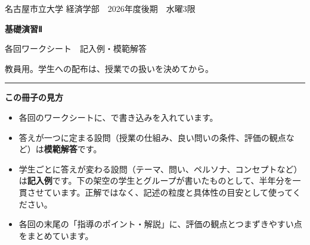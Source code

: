 \thispagestyle{cover}
\vspace*{12mm}
{\sffamily\color{pone}\large 名古屋市立大学 経済学部　2026年度後期　水曜3限}\par
\vspace{3mm}
{\sffamily\bfseries\fontsize{30pt}{38pt}\selectfont 基礎演習Ⅱ}\par
\vspace{2mm}
{\sffamily\fontsize{20pt}{26pt}\selectfont 各回ワークシート　\textcolor{ans}{記入例・模範解答}}\par
\vspace{2mm}
{\sffamily\small\color{inktwo}教員用。学生への配布は、授業での扱いを決めてから。}\par
\vspace{3mm}
{\color{inktwo}\rule{\linewidth}{0.6pt}}\par
\vspace{6mm}

\begin{tcolorbox}[enhanced,colback=papertwo,colframe=papertwo,boxrule=0pt,arc=1.5mm,
    left=4mm,right=4mm,top=3mm,bottom=3mm,fontupper=\small]
{\sffamily\bfseries この冊子の見方}\par\vspace{1mm}
\begin{itemize}[label=・]
  \item 各回のワークシートに、で書き込みを入れています。
  \item 答えが一つに定まる設問（授業の仕組み、良い問いの条件、評価の観点など）は\textbf{模範解答}です。
  \item 学生ごとに答えが変わる設問（テーマ、問い、ペルソナ、コンセプトなど）は\textbf{記入例}です。下の架空の学生とグループが書いたものとして、半年分を一貫させています。正解ではなく、記述の粒度と具体性の目安として使ってください。
  \item 各回の末尾の「\textcolor{ans}{指導のポイント・解説}」に、評価の観点とつまずきやすい点をまとめています。
\end{itemize}
\end{tcolorbox}

